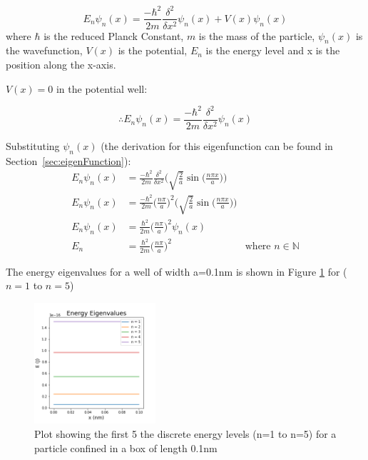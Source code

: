 $$E_n \psi_n (x) = \frac{-\hbar ^{2}}{2m}\frac{\delta^{2}}{\delta x^{2}}\psi_n (x) + V(x)\psi_n (x)$$
where $\hbar$ is the reduced Planck Constant, $m$ is the mass of the particle, $\psi_n (x)$ is the wavefunction, $V(x)$ is the potential, $E_n$ is the energy level and x is the position along the x-axis. 

$V(x)=0$ in the potential well: 

\begin{equation} \label{eq:shrod}
\therefore E_n \psi_n (x) = \frac{-\hbar ^{2}}{2m}\frac{\delta^{2}}{\delta x^{2}}\psi_n (x)
\end{equation}

Substituting $\psi_n (x)$ (the derivation for this eigenfunction can be found in Section~\ref{sec:eigenFunction}):
\begin{align*}
E_n \psi_n (x) &= \frac{-\hbar ^{2}}{2m}\frac{\delta^{2}}{\delta x^{2}}\Bigg(\sqrt{\frac{2}{a}}\sin\Big(\frac{n\pi x}{a}\Big)\Bigg)\\
E_n \psi_n (x) &= \frac{-\hbar ^{2}}{2m}\Big(\frac{n\pi}{a}\Big)^{2}\Bigg(\sqrt{\frac{2}{a}}\sin\Big(\frac{n\pi x}{a}\Big)\Bigg)\\
E_n \psi_n (x) &= \frac{\hbar ^{2}}{2m}\Big(\frac{n\pi}{a}\Big)^{2}\psi_n (x)\\
E_n &= \frac{\hbar ^{2}}{2m}\Big(\frac{n\pi}{a}\Big)^{2} & \text{where } n \in \mathbb{N}
\end{align*}

The energy eigenvalues for a well of width a=0.1nm is shown in Figure \ref{fig:eigenEnergy} for ($n=1$ to $n=5$)

\begin{figure}[h]
    \centering
    \includegraphics[width=0.4\textwidth]{lab1/images/eigenvaluesEnergy.png}
    \captionsetup{font = it, labelfont = bf, width=.91\linewidth, justification=centering}
    \caption{Plot showing the first 5 the discrete energy levels (n=1 to n=5) for a particle confined in a box of length 0.1nm} 
    \label{fig:eigenEnergy}
\end{figure}

